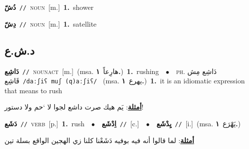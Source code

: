 \documentclass[10pt,a4paper,twoside]{article} %
\begin{document}
\begin{multicols}{2}
{\setlength\topsep{0pt}\textbf{\foreignlanguage{arabic}{دُشّ}}\ {\color{gray}\texttt{//}\color{black}}\ \textsc{noun}\ [m.]\ \textbf{1.}~shower\ } \vspace{2mm}

{\setlength\topsep{0pt}\textbf{\foreignlanguage{arabic}{دِشّ}}\ {\color{gray}\texttt{//}\color{black}}\ \textsc{noun}\ [m.]\ \textbf{1.}~satellite\ } \vspace{2mm}

\vspace{-3mm}
\subsection*{\color{blue}\foreignlanguage{arabic}{د.ش.ع}\color{blue}{}} 

{\setlength\topsep{0pt}\textbf{\foreignlanguage{arabic}{دَاشِع}}\ {\color{gray}\texttt{//}\color{black}}\ \textsc{noun\textunderscore act}\ [m.]\ \color{gray}(msa. \foreignlanguage{arabic}{هارِعاً}~\foreignlanguage{arabic}{\textbf{١.}})\color{black}\ \textbf{1.}~rushing\ \ $\bullet$\ \ \textsc{ph.} \color{gray} \foreignlanguage{arabic}{دَاشِع مِش قَاشِع}\color{black}\ {\color{gray}\texttt{/{\sffamily daːʃiʕ muʃ (q)aːʃiʕ}/}\color{black}}\ \color{gray} (msa. \foreignlanguage{arabic}{يهرع}~\foreignlanguage{arabic}{\textbf{١.}})\color{black}\ \textbf{1.}~it is an idiomatic expression that means to rush\  \begin{flushright}\color{gray}\foreignlanguage{arabic}{\textbf{\underline{\foreignlanguage{arabic}{أمثلة}}}: يَم هيك صرت داشع لجوا لا ‘حم ولا دستور!}\end{flushright}\color{black}} \vspace{2mm}

{\setlength\topsep{0pt}\textbf{\foreignlanguage{arabic}{دَشَع}}\ {\color{gray}\texttt{//}\color{black}}\ \textsc{verb}\ [p.]\ \textbf{1.}~rush\ \ $\bullet$\ \ \setlength\topsep{0pt}\textbf{\foreignlanguage{arabic}{اِدْشَع}}\ {\color{gray}\texttt{//}\color{black}}\ [c.]\ \ $\bullet$\ \ \setlength\topsep{0pt}\textbf{\foreignlanguage{arabic}{يِدْشَع}}\ {\color{gray}\texttt{//}\color{black}}\ [i.]\ \color{gray}(msa. \foreignlanguage{arabic}{يَهْرَع}~\foreignlanguage{arabic}{\textbf{١.}})\color{black}\  \begin{flushright}\color{gray}\foreignlanguage{arabic}{\textbf{\underline{\foreignlanguage{arabic}{أمثلة}}}: لما قالوا أنه فيه بوفيه دَشَعْنا كلنا زي الهجين الواقع بسلة تين}\end{flushright}\color{black}} \vspace{2mm}


\end{multicols}
\end{document}
